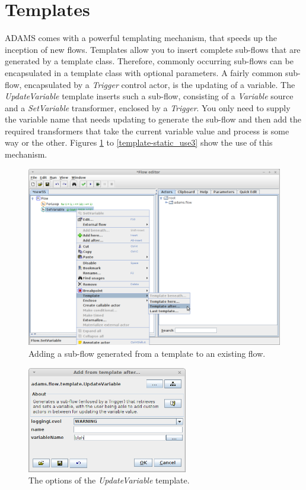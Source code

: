 \section{Templates}
\label{templates}
ADAMS comes with a powerful templating mechanism, that speeds up the
inception of new flows. Templates allow you to insert complete sub-flows
that are generated by a template class. Therefore, commonly occurring sub-flows
can be encapsulated in a template class with optional parameters. A fairly
common sub-flow, encapsulated by a \textit{Trigger} control actor, is the
updating of a variable. The \textit{UpdateVariable} template inserts such a
sub-flow, consisting of a \textit{Variable} source and a \textit{SetVariable}
transformer, enclosed by a \textit{Trigger}. You only need to supply the
variable name that needs updating to generate the sub-flow and then add the
required transformers that take the current variable value and process is some
way or the other. Figures \ref{template-static_use1} to
\ref{template-static_use3} show the use of this mechanism.

\begin{figure}[htb]
  \centering
  \includegraphics[width=12.0cm]{images/template-static_use1.png}
  \caption{Adding a sub-flow generated from a template to an existing flow.}
  \label{template-static_use1}
\end{figure}

\begin{figure}[htb]
  \centering
  \includegraphics[width=7.0cm]{images/template-static_use2.png}
  \caption{The options of the \textit{UpdateVariable} template.}
  \label{template-static_use2}
\end{figure}

